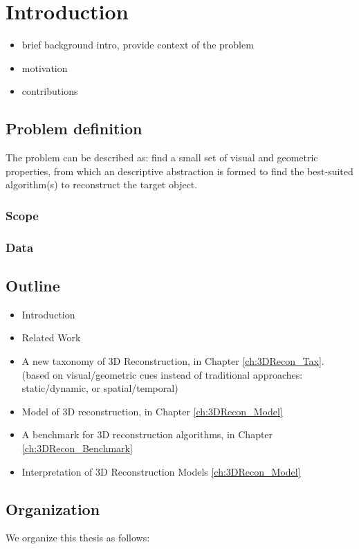 
\chapter{Introduction}
\label{ch:Introduction}

\begin{itemize}
\item brief background intro, provide context of the problem
\item motivation
\item contributions
\end{itemize}

\section{Problem definition}
The problem can be described as: find a small set of visual and geometric properties, from which an descriptive abstraction is formed to find the best-suited algorithm(s) to reconstruct the target object.
\subsection{Scope}

\subsection{Data}

\section{Outline}
\begin{itemize}
\item Introduction
\item Related Work
\item A new taxonomy of 3D Reconstruction, in Chapter \ref{ch:3DRecon_Tax}. (based on visual/geometric cues instead of traditional approaches: static/dynamic, or spatial/temporal)
\item Model of 3D reconstruction, in Chapter \ref{ch:3DRecon_Model}
\item A benchmark for 3D reconstruction algorithms, in Chapter \ref{ch:3DRecon_Benchmark}
\item Interpretation of 3D Reconstruction Models \ref{ch:3DRecon_Model}
\end{itemize}

\section{Organization}
We organize this thesis as follows: 